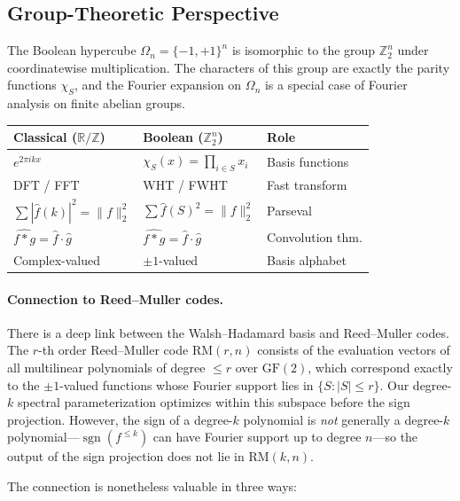 \documentclass[12pt,a4paper]{article}
\theoremstyle{plain}
\theoremstyle{definition}
\theoremstyle{remark}
\newcommand{\R}{\mathbb{R}}
\newcommand{\Z}{\mathbb{Z}}
\newcommand{\pmone}{\{-1,+1\}}
\newcommand{\fhat}{\widehat{f}}
\newcommand{\sgn}{\operatorname{sgn}}
\begin{document}
\subsection{Group-Theoretic Perspective}\label{sec:group-theory}

The Boolean hypercube $\Omega_n = \pmone^n$ is isomorphic to the group $\Z_2^n$ under coordinatewise multiplication. The characters of this group are exactly the parity functions $\chi_S$, and the Fourier expansion on $\Omega_n$ is a special case of Fourier analysis on finite abelian groups.

\begin{center}
\begin{tabular}{@{} l l l @{}}
\toprule
\textbf{Classical ($\R/\Z$)} & \textbf{Boolean ($\Z_2^n$)} & \textbf{Role} \\
\midrule
$e^{2\pi i k x}$ & $\chi_S(x) = \prod_{i \in S} x_i$ & Basis functions \\
DFT / FFT & WHT / FWHT & Fast transform \\
$\sum |\hat{f}(k)|^2 = \|f\|_2^2$ & $\sum \fhat(S)^2 = \|f\|_2^2$ & Parseval \\
$\hat{f \ast g} = \hat{f} \cdot \hat{g}$ & $\widehat{f \ast g} = \hat{f} \cdot \hat{g}$ & Convolution thm. \\
Complex-valued & $\pm 1$-valued & Basis alphabet \\
\bottomrule
\end{tabular}
\end{center}

\paragraph{Connection to Reed--Muller codes.}
There is a deep link between the Walsh--Hadamard basis and Reed--Muller codes. The $r$-th order Reed--Muller code $\text{RM}(r, n)$ consists of the evaluation vectors of all multilinear polynomials of degree $\leq r$ over $\text{GF}(2)$, which correspond exactly to the $\pm 1$-valued functions whose Fourier support lies in $\{S : |S| \leq r\}$. Our degree-$k$ spectral parameterization optimizes within this subspace before the sign projection. However, the sign of a degree-$k$ polynomial is \emph{not} generally a degree-$k$ polynomial---$\sgn(f^{\leq k})$ can have Fourier support up to degree $n$---so the output of the sign projection does not lie in $\text{RM}(k, n)$.

The connection is nonetheless valuable in three ways:
\end{document}
